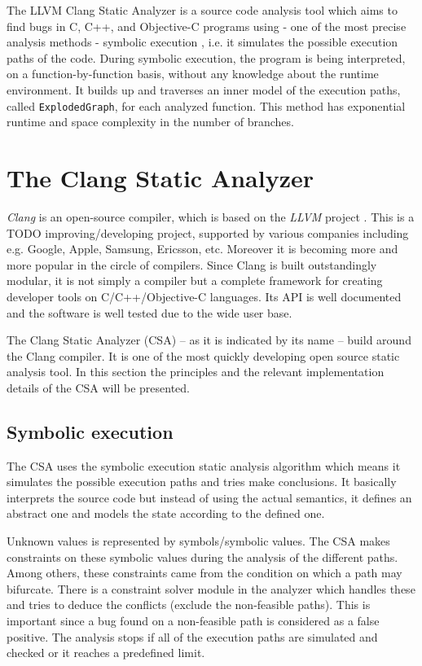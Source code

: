 \documentclass[oneside, a4paper, 12pt]{article}
\theoremstyle{definition}
\begin{document}
The LLVM Clang Static Analyzer is a source code analysis tool which aims to 
find bugs in C,
C++, and Objective-C programs using - one of the most precise analysis methods 
- symbolic execution  \cite{King1975} \cite{Hampapuram2005}, i.e. it simulates 
the possible execution paths of the code. During symbolic execution, the 
program is being interpreted, on a function-by-function basis, without any 
knowledge about the runtime environment. It builds up and traverses an inner 
model of the execution paths, called \texttt{ExplodedGraph}, for each analyzed 
function. This method has exponential runtime and space complexity in the 
number of branches.


\section{The Clang Static Analyzer}

\emph{Clang} is an open-source compiler, which is based on the \emph{LLVM} 
project \cite{lattner:clang}. This is a TODO improving/developing project, 
supported by various companies including e.g. Google, Apple, Samsung, Ericsson, 
etc. Moreover it is becoming more and more popular in the circle of compilers. 
Since Clang is built outstandingly modular, it is not simply a compiler but a 
complete framework for creating developer tools on C/C++/Objective-C 
languages. Its API is well documented and the software is well tested due to 
the wide user base.


The Clang Static Analyzer (CSA) -- as it is indicated by its name -- build 
around the 
Clang compiler. It is one of the most quickly developing open source static 
analysis tool. In this section the principles and the relevant implementation 
details of the CSA will be presented.
\subsection{Symbolic execution}
The CSA uses the symbolic execution static analysis algorithm which means it 
simulates the possible execution paths and tries make conclusions. It basically 
interprets the source code but instead of using the actual semantics, it 
defines an abstract one and models the state according to the defined one.

Unknown values is represented by symbols/symbolic values. The CSA makes 
constraints on these symbolic values during the analysis of the different 
paths. Among others, these constraints came from the condition on which a path 
may bifurcate. There is a constraint solver module in the analyzer which 
handles these and tries to deduce the conflicts (exclude the non-feasible 
paths). This is important since a bug found on a non-feasible path is 
considered as a false positive. The analysis stops if all of the execution 
paths are simulated and checked or it reaches a predefined limit.
\end{document}

